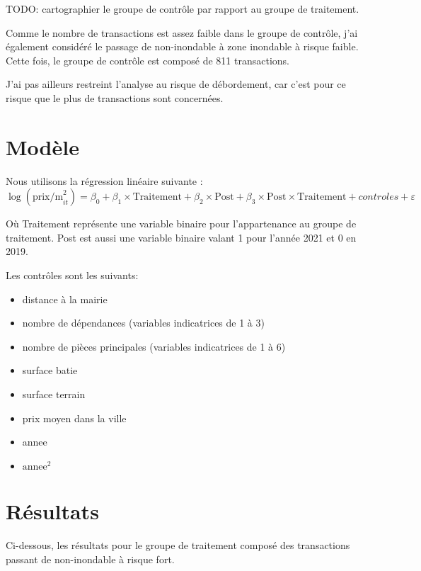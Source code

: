 \documentclass[a4paper,12pt]{article}
\begin{document}
TODO: cartographier le groupe de contrôle par rapport au groupe de traitement. 

Comme le nombre de transactions est assez faible dans le groupe de contrôle, j'ai également considéré le passage de non-inondable à zone inondable à risque faible. Cette fois, le groupe de contrôle est composé de 811 transactions. \newline

J'ai pas ailleurs restreint l'analyse au risque de débordement, car c'est pour ce risque que le plus de transactions sont concernées. \newline


\section{Modèle}
Nous utilisons la régression linéaire suivante :
\begin{equation}
	\log(\text{prix/m}^2_{it}) = \beta_0 + \beta_1 \times \text{Traitement} + \beta_2 \times \text{Post} + \beta_3 \times \text{Post} \times \text{Traitement} + controles + \varepsilon
\end{equation}

Où Traitement représente une variable binaire pour l'appartenance au groupe de traitement. Post est aussi une variable binaire valant 1 pour l'année 2021 et 0 en 2019. \newline

Les contrôles sont les suivants:
\begin{itemize}
\item distance à la mairie
\item nombre de dépendances (variables indicatrices de 1 à 3)
\item nombre de pièces principales (variables indicatrices de 1 à 6)
\item surface batie
\item surface terrain
\item prix moyen dans la ville
\item annee
\item \( \text{annee}^2 \)
\end{itemize}

\section{Résultats}

Ci-dessous, les résultats pour le groupe de traitement composé des transactions passant de non-inondable à risque fort. \newline
\end{document}
